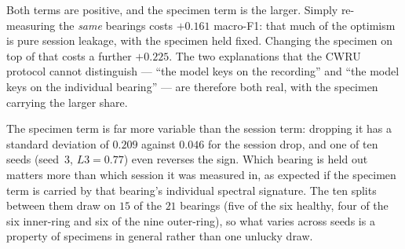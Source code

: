 \documentclass[journal]{IEEEtran}
\begin{document}
\begin{table}[t]
\centering
\caption{Decomposing the optimism, and the same decomposition with the rig tone
removed. One training set (files 1--4 of five bearings per class, first $70\%$
of windows) is evaluated on three test sets that differ by exactly one factor
each: L2 moves only the recording session, L3 moves the specimen as well. Same
condition, epochs and seeds as Table~\ref{tab:pb_leak}; the \emph{no filter}
column is that table's two endpoints. In the last two columns every window is
masked in the frequency domain and renormalized before training, and the whole
procedure is repeated from scratch: the notch removes $100$\,Hz and its first
twenty harmonics with $\pm2$ bins each, and the high-pass is the $2$\,kHz
control of Table~\ref{tab:bench}.}
\label{tab:pb_levels}
\small
{}
\end{table}

Both terms are positive, and the specimen term is the larger. Simply
re-measuring the \emph{same} bearings costs $+0.161$ macro-F1: that much
of the optimism is pure session leakage, with the specimen held fixed. Changing
the specimen on top of that costs a further $+0.225$. The two explanations that
the CWRU protocol cannot distinguish --- ``the model keys on the recording'' and
``the model keys on the individual bearing'' --- are therefore both real, with
the specimen carrying the larger share.

The specimen term is far more variable than the session term: dropping it has a standard deviation of $0.209$ against
$0.046$ for the session drop, and one of ten seeds (seed~3, $L3 = 0.77$) even
reverses the sign. Which bearing is held out matters more than which session it
was measured in, as expected if the specimen term is carried by that
bearing's individual spectral signature. The ten splits between them draw on
$15$ of the $21$ bearings (five of the six healthy, four of the six inner-ring
and six of the nine outer-ring), so what varies across seeds is a property of
specimens in general rather than one unlucky draw.
\end{document}
